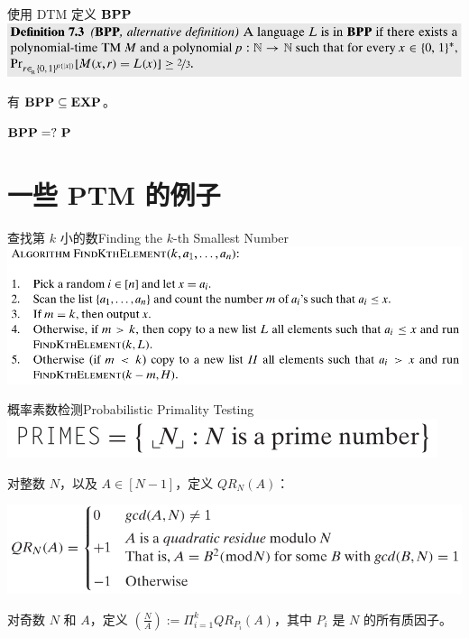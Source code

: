 \documentclass[UTF8,aspectratio=169,mathserif]{beamer}
\begin{document}
	\begin{frame}{使用 DTM 定义 $\bf BPP$}
		\includegraphics[width=\linewidth]{../../7/note.assets/image-20210508142316582.png}\newline
		
		有 $\bf BPP\subseteq EXP$。\newline
		
		${\bf BPP}=?\ {\bf P}$
	\end{frame}
	
	\section{一些 PTM 的例子}
	\begin{frame}{查找第 $k$ 小的数}{Finding the $k$-th Smallest Number}
		\includegraphics[width=\linewidth]{../../7/note.assets/image-20210508183753819.png}
	\end{frame}

	\begin{frame}{概率素数检测}{Probabilistic Primality Testing}
		\includegraphics[width=0.4\linewidth]{../../7/note.assets/image-20210508190017980.png}\newline
		
		对整数 $N$，以及 $A\in[N-1]$，定义 $QR_N(A)$：
		
		\includegraphics[width=0.7\linewidth]{../../7/note.assets/image-20210508203151275.png}\newline
		
		对奇数 $N$ 和 $A$，定义 $(\frac{N}{A}):=\Pi^k_{i=1}QR_{P_i}(A)$，其中 $P_i$ 是 $N$ 的所有质因子。
	\end{frame}
\end{document}
